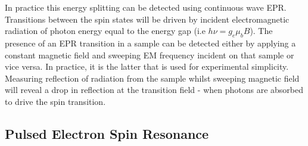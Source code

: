 In practice this energy splitting can be detected using continuous wave EPR. Transitions between the spin states will be driven by incident electromagnetic radiation of photon energy equal to the energy gap (i.e $h\nu = g_e\mu_bB$). 
The presence of an EPR transition in a sample can be detected either by applying a constant magnetic field and sweeping EM frequency incident on that sample or vice versa.
In practice, it is the latter that is used for experimental simplicity.
Measuring reflection of radiation from the sample whilst sweeping magnetic field will reveal a drop in reflection at the transition field - when photons are absorbed to drive the spin transition.

\subsection{Pulsed Electron Spin Resonance}